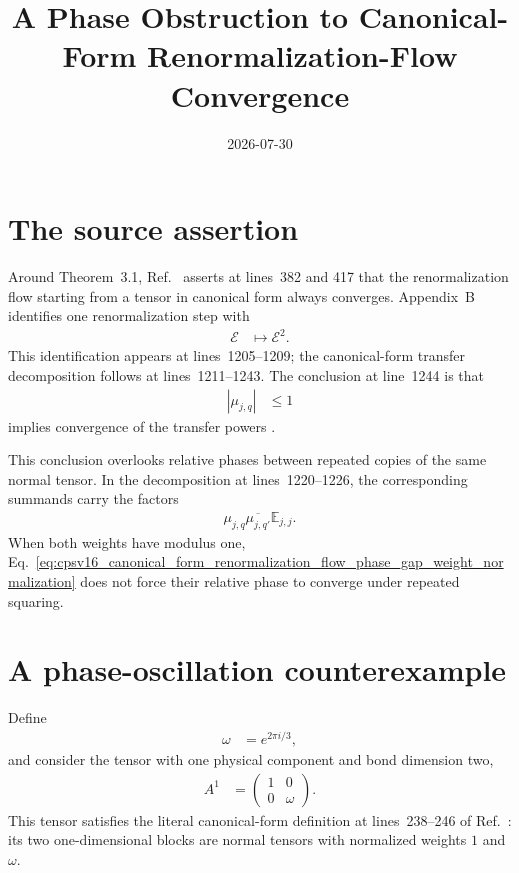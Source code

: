 \documentclass{article}
\title{A Phase Obstruction to Canonical-Form Renormalization-Flow Convergence}
\author{}
\date{2026-07-30}
\begin{document}
\maketitle
{}

\section{The source assertion}

Around Theorem~3.1, Ref.~\cite{Cirac2016MPDO_arXiv} asserts at lines~382 and
417 that the renormalization flow starting from a tensor in canonical form
always converges. Appendix~B identifies one renormalization step with
\begin{align}
    \mathcal E
        &\longmapsto
    \mathcal E^2.
    \label{eq:cpsv16_canonical_form_renormalization_flow_phase_gap_renormalization_step}
\end{align}
This identification appears at lines~1205--1209; the canonical-form transfer
decomposition follows at lines~1211--1243. The conclusion at line~1244 is that
\begin{align}
    |\mu_{j,q}|
        &\leq
    1
    \label{eq:cpsv16_canonical_form_renormalization_flow_phase_gap_weight_normalization}
\end{align}
implies convergence of the transfer powers
\cite{Cirac2016MPDO_arXiv}.

This conclusion overlooks relative phases between repeated copies of the same
normal tensor. In the decomposition at lines~1220--1226, the corresponding
summands carry the factors
\begin{align}
    \mu_{j,q}\overline{\mu_{j,q'}}
    \mathbb E_{j,j}.
    \label{eq:cpsv16_canonical_form_renormalization_flow_phase_gap_repeated_copy_factor}
\end{align}
When both weights have modulus one,
Eq.~\ref{eq:cpsv16_canonical_form_renormalization_flow_phase_gap_weight_normalization}
does not force their relative phase to converge under repeated squaring.

\section{A phase-oscillation counterexample}

Define
\begin{align}
    \omega
        &=
    e^{2\pi i/3},
    \label{eq:cpsv16_canonical_form_renormalization_flow_phase_gap_third_root}
\end{align}
and consider the tensor with one physical component and bond dimension two,
\begin{align}
    A^1
        &=
    \begin{pmatrix}
        1 & 0\\
        0 & \omega
    \end{pmatrix}.
    \label{eq:cpsv16_canonical_form_renormalization_flow_phase_gap_counterexample_tensor}
\end{align}
This tensor satisfies the literal canonical-form definition at lines~238--246
of Ref.~\cite{Cirac2016MPDO_arXiv}: its two one-dimensional blocks are normal
tensors with normalized weights $1$ and $\omega$.
\end{document}
